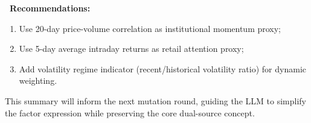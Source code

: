 \begin{tcolorbox}[
  colback=lightblue,
  colframe=darkblue,
  fonttitle=\bfseries,
  title={\faComments\ Evaluation \& Summary},
  arc=2mm,
  boxrule=0.5pt,
  breakable
]
\vspace{0.2cm}

\textbf{\faExclamationTriangle\ Recommendations:}
\begin{enumerate}
    \setlength{\itemsep}{0pt}
    \setlength{\parsep}{0pt}
    \setlength{\topsep}{0pt}
    \setlength{\partopsep}{0pt}
    \small
    \item Use 20-day price-volume correlation as institutional momentum proxy;
    \item Use 5-day average intraday returns as retail attention proxy;
    \item Add volatility regime indicator (recent/historical volatility ratio) for dynamic weighting.
\end{enumerate}

\small This summary will inform the next mutation round, guiding the LLM to simplify the factor expression while preserving the core dual-source concept.

\end{tcolorbox}


